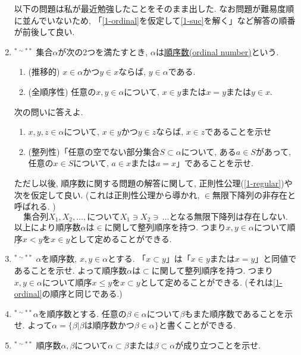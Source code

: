 \documentclass[dvipdfmx,a4paper,11pt]{article}
\theoremstyle{definition}
\begin{document}
\begin{enumerate}[label=\textbf{問}\ref*{sec-1}.\arabic*]
\medskip
以下の問題は私が最近勉強したことをそのまま出した. %
なお問題が難易度順に並んでいないため, 「\ref{1-ordinal}を仮定して\ref{1-suc}を解く」など解答の順番が前後して良い. 
 
\item $^{* \sim **}$ \label{1-ordinal}集合$\alpha$が次の2つを満たすとき, $\alpha$は\underline{順序数(ordinal number)}という. 
\begin{enumerate}[label=(\alph*).]
 \setlength{\parskip}{0cm}
  \setlength{\itemsep}{0pt}
\item (推移的) $x \in \alpha$かつ$y \in x$ならば, $y \in \alpha$である. 
\item (全順序性) 任意の$x,y \in \alpha$について, $x \in y$または$x=y$または$y \in x$.
  \end{enumerate}
  次の問いに答えよ.
  \begin{enumerate}[label=(\arabic*).]
 \setlength{\parskip}{0cm}
  \setlength{\itemsep}{0pt}
  \item $x,y,z \in \alpha$について, $x \in y$かつ$y \in z$ならば, $x \in z$であることを示せ
 \item (整列性)「任意の空でない部分集合$S \subset \alpha$について, ある$a\in S$があって, 任意の$x \in S$について, $a \in x$または$a=x$」であることを示せ.
  \end{enumerate}
 ただし以後, 順序数に関する問題の解答に関して, 正則性公理(\ref{1-regular})や次を仮定して良い. (これは正則性公理から導かれ, $\in$無限下降列の非存在と呼ばれる. )
 $$
 \text{集合列$X_1, X_2, \ldots, $について$X_1\ni X_2\ni \, \ldots $となる無限下降列は存在しない. }
 $$
以上により順序数$\alpha$は$\in$に関して整列順序を持つ. 
つまり$x,y \in \alpha$について順序$x < y$を$x \in y$として定めることができる. 
 
 \item $^{* \sim **}$ $\alpha$を順序数, $x,y \in \alpha$とする. 「$x \subset y$」は「$x \in y$または$x = y$」と同値であることを示せ.
  よって順序数$\alpha$は$\subset$に関して整列順序を持つ. 
つまり$x,y \in \alpha$について順序$x \le y$を$x \subset y$として定めることができる.  (それは\ref{1-ordinal}の順序と同じである.)

 \item $^{* \sim **}$$\alpha$を順序数とする. 任意の$\beta \in \alpha$について$\beta$もまた順序数であることを示せ.
 よって$\alpha=\{\beta | \text{$\beta$は順序数かつ$\beta \in \alpha $} \}$と書くことができる.

 
 \item $^{* \sim **}$ 順序数$\alpha, \beta$について$\alpha \subset \beta$または$\beta \subset \alpha$が成り立つことを示せ.
  

\end{enumerate}
\end{document}
